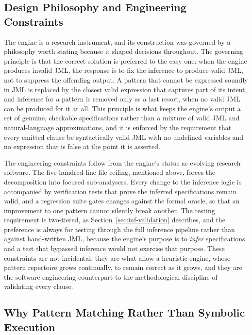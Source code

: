 \subsection{Design Philosophy and Engineering Constraints}

The engine is a research instrument, and its construction was governed by a
philosophy worth stating because it shaped decisions throughout. The governing
principle is that the correct solution is preferred to the easy one: when the
engine produces invalid JML, the response is to fix the inference to produce valid
JML, not to suppress the offending output. A pattern that cannot be expressed
soundly in JML is replaced by the closest valid expression that captures part of
its intent, and inference for a pattern is removed only as a last resort, when no
valid JML can be produced for it at all. This principle is what keeps the engine's
output a set of genuine, checkable specifications rather than a mixture of valid
JML and natural-language approximations, and it is enforced by the requirement that
every emitted clause be syntactically valid JML with no undefined variables and no
expression that is false at the point it is asserted.

The engineering constraints follow from the engine's status as evolving research
software. The five-hundred-line file ceiling, mentioned above, forces the
decomposition into focused sub-analysers. Every change to the inference logic is
accompanied by verification tests that prove the inferred specifications remain
valid, and a regression suite gates changes against the formal oracle, so that an
improvement to one pattern cannot silently break another. The testing requirement
is two-tiered, as Section~\ref{sec:inf-validation} describes, and the preference is
always for testing through the full inference pipeline rather than against
hand-written JML, because the engine's purpose is to \emph{infer} specifications
and a test that bypassed inference would not exercise that purpose. These
constraints are not incidental; they are what allow a heuristic engine, whose
pattern repertoire grows continually, to remain correct as it grows, and they are
the software-engineering counterpart to the methodological discipline of validating
every clause.

\subsection{Why Pattern Matching Rather Than Symbolic Execution}

